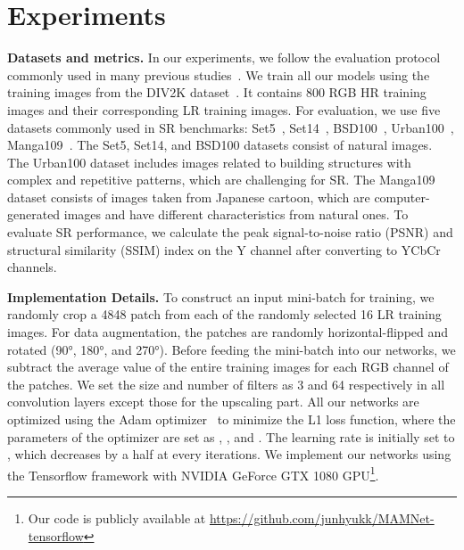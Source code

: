 \documentclass[final,5p,times,twocolumn]{elsarticle}
\begin{document}
\section{Experiments}
\label{section:Experiments}
\textbf{Datasets and metrics.}
In our experiments, we follow the evaluation protocol commonly used in many previous studies~\cite{lim2017enhanced, zhang2018residual,zhang2018rcan}.
We train all our models using the training images from the DIV2K dataset~\cite{Timofte_2018_CVPR_Workshops}.
It contains 800 RGB HR training images and their corresponding LR training images.
For evaluation, we use five datasets commonly used in SR benchmarks: Set5~\cite{bevilacqua2012low}, Set14~\cite{zeyde2010single}, BSD100~\cite{martin2001database}, Urban100~\cite{huang2015single}, Manga109~\cite{matsui2017sketch}.
The Set5, Set14, and BSD100 datasets consist of natural images.
The Urban100 dataset includes images related to building structures with complex and repetitive patterns, which are challenging for SR.
The Manga109 dataset consists of images taken from Japanese cartoon, which are computer-generated images and have different characteristics from natural ones.
To evaluate SR performance, we calculate the peak signal-to-noise ratio (PSNR) and structural similarity (SSIM) index on the Y channel after converting to YCbCr channels.

\textbf{Implementation Details.}
To construct an input mini-batch for training, we randomly crop a 4848 patch from each of the randomly selected 16 LR training images.
For data augmentation, the patches are randomly horizontal-flipped and rotated (\ang{90}, \ang{180}, and \ang{270}).
Before feeding the mini-batch into our networks, we subtract the average value of the entire training images for each RGB channel of the patches.
We set the size and number of filters as 3 and 64 respectively in all convolution layers except those for the upscaling part.
All our networks are optimized using the Adam optimizer~\cite{kingma2014adam} to minimize the L1 loss function, where the parameters of the optimizer are set as , , and .
The learning rate is initially set to , which decreases by a half at every  iterations.  
We implement our networks using the Tensorflow framework with NVIDIA GeForce GTX 1080 GPU\footnote{Our code is publicly available at \url{https://github.com/junhyukk/MAMNet-tensorflow}}.
\end{document}
